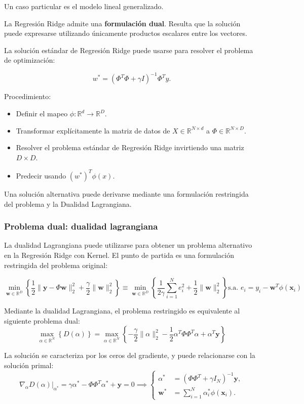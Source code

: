 Un caso particular es el modelo lineal generalizado.

La Regresión Ridge admite una \textbf{formulación dual}. 
Resulta que la solución puede expresarse utilizando únicamente productos escalares entre los vectores.

La solución estándar de Regresión Ridge puede usarse para resolver el problema de optimización:

$$w^* = (\Phi^T \Phi + \gamma I)^{-1} \Phi^T y.$$

Procedimiento:
\begin{itemize}
\item Definir el mapeo $\phi : \mathbb{R}^d \to \mathbb{R}^D$.
\item Transformar explícitamente la matriz de datos de $X \in \mathbb{R}^{N \times d}$ a $\Phi \in \mathbb{R}^{N \times D}$.
\item Resolver el problema estándar de Regresión Ridge invirtiendo una matriz $D \times D$.
\item Predecir usando $(w^*)^T \phi(x)$.
\end{itemize}

Una solución alternativa puede derivarse mediante una formulación restringida del problema y la Dualidad Lagrangiana.

\subsubsection{Problema dual: dualidad lagrangiana}

La dualidad Lagrangiana puede utilizarse para obtener un problema alternativo en la Regresión Ridge con Kernel.  
El punto de partida es una formulación restringida del problema original:

$$\min_{\mathbf{w} \in \mathbb{R}^D} \left\{ \frac{1}{2} \| \mathbf{y} - \Phi \mathbf{w} \|_2^2 + \frac{\gamma}{2} \| \mathbf{w} \|_2^2 \right\} \equiv \min_{\mathbf{w} \in \mathbb{R}^D} \left\{ \frac{1}{2 \gamma} \sum_{i=1}^N e_i^2 + \frac{1}{2} \| \mathbf{w} \|_2^2 \right\} \text{s.a. } e_i = y_i - \mathbf{w}^T \phi (\mathbf{x}_i)$$

Mediante la dualidad Lagrangiana, el problema restringido es equivalente al siguiente problema dual:
$$\max_{\alpha \in \mathbb{R}^N} \left\{ D(\alpha) \right\} = \max_{\alpha \in \mathbb{R}^N} \left\{ -\frac{\gamma}{2} \| \alpha \|_2^2 - \frac{1}{2} \alpha^T \Phi \Phi^T \alpha + \alpha^T \mathbf{y} \right\}$$

La solución se caracteriza por los ceros del gradiente, y puede relacionarse con la solución primal:
$$\nabla_\alpha D(\alpha) \bigg|_{\alpha^*} = \gamma \alpha^* - \Phi \Phi^T \alpha^* + \mathbf{y} = 0 \implies \begin{cases}
\alpha^* & = (\Phi \Phi^T + \gamma I_N)^{-1} \mathbf{y}, \\
\mathbf{w}^* & = \sum_{i=1}^N \alpha_i^* \phi (\mathbf{x}_i).
\end{cases}$$

